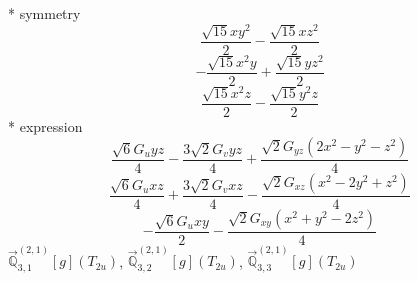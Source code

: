 \documentclass[fleqn,8pt]{jsarticle}
\begin{document}
\noindent\quad ** symmetry
\begin{dmath*}
\frac{\sqrt{15} x y^{2}}{2} - \frac{\sqrt{15} x z^{2}}{2}
\end{dmath*}
\begin{dmath*}
- \frac{\sqrt{15} x^{2} y}{2} + \frac{\sqrt{15} y z^{2}}{2}
\end{dmath*}
\begin{dmath*}
\frac{\sqrt{15} x^{2} z}{2} - \frac{\sqrt{15} y^{2} z}{2}
\end{dmath*}
\noindent\quad ** expression
\begin{dmath*}
\frac{\sqrt{6} G_{u} y z}{4} - \frac{3 \sqrt{2} G_{v} y z}{4} + \frac{\sqrt{2} G_{yz} \left(2 x^{2} - y^{2} - z^{2}\right)}{4}
\end{dmath*}
\begin{dmath*}
\frac{\sqrt{6} G_{u} x z}{4} + \frac{3 \sqrt{2} G_{v} x z}{4} - \frac{\sqrt{2} G_{xz} \left(x^{2} - 2 y^{2} + z^{2}\right)}{4}
\end{dmath*}
\begin{dmath*}
- \frac{\sqrt{6} G_{u} x y}{2} - \frac{\sqrt{2} G_{xy} \left(x^{2} + y^{2} - 2 z^{2}\right)}{4}
\end{dmath*}
\noindent\quad $\vec{\mathbb{Q}}_{3,1}^{(2,1)}[g](T_{2u})$, $\vec{\mathbb{Q}}_{3,2}^{(2,1)}[g](T_{2u})$, $\vec{\mathbb{Q}}_{3,3}^{(2,1)}[g](T_{2u})$
\end{document}
